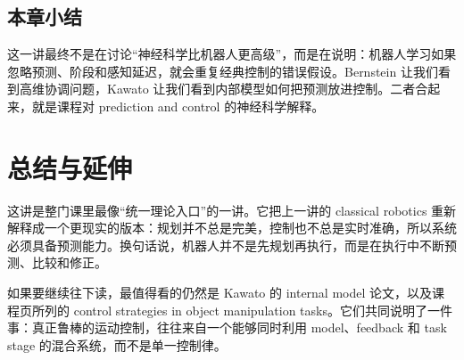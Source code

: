 \documentclass[a4paper]{article}
\begin{document}
\subsection{本章小结}
这一讲最终不是在讨论“神经科学比机器人更高级”，而是在说明：机器人学习如果忽略预测、阶段和感知延迟，就会重复经典控制的错误假设。Bernstein 让我们看到高维协调问题，Kawato 让我们看到内部模型如何把预测放进控制。二者合起来，就是课程对 prediction and control 的神经科学解释。

\section{总结与延伸}
这讲是整门课里最像“统一理论入口”的一讲。它把上一讲的 classical robotics 重新解释成一个更现实的版本：规划并不总是完美，控制也不总是实时准确，所以系统必须具备预测能力。换句话说，机器人并不是先规划再执行，而是在执行中不断预测、比较和修正。

如果要继续往下读，最值得看的仍然是 Kawato 的 internal model 论文，以及课程页所列的 control strategies in object manipulation tasks。它们共同说明了一件事：真正鲁棒的运动控制，往往来自一个能够同时利用 model、feedback 和 task stage 的混合系统，而不是单一控制律。
\end{document}
